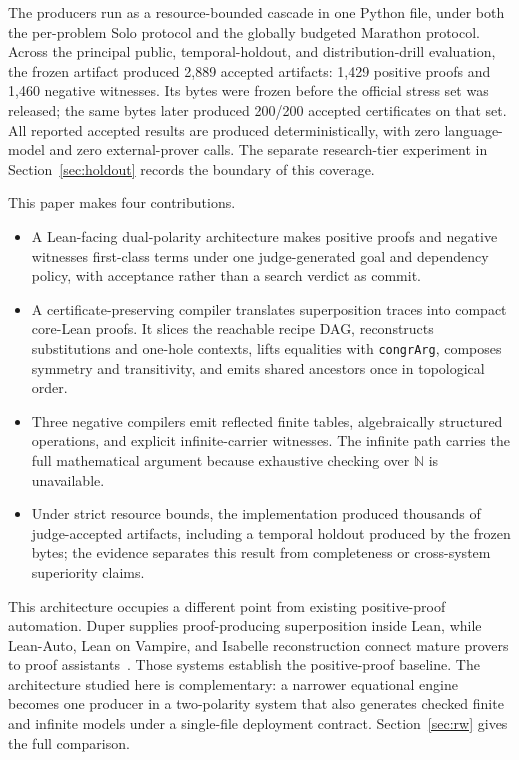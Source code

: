 \documentclass[10pt,twocolumn]{article}
\newcommand{\Nat}{\mathbb{N}}
\newcommand{\code}[1]{\texttt{#1}}
\begin{document}
The producers run as a resource-bounded cascade in one Python file, under both
the per-problem Solo protocol and the globally budgeted Marathon protocol.
Across the principal public, temporal-holdout, and distribution-drill
evaluation, the frozen artifact produced 2,889 accepted artifacts: 1,429
positive proofs and 1,460 negative witnesses.  Its bytes were frozen before
the official stress set was released; the same bytes later produced 200/200
accepted certificates on that set.  All reported accepted results are
produced deterministically, with zero language-model and zero external-prover
calls.  The separate research-tier experiment in
Section~\ref{sec:holdout} records the boundary of this coverage.

This paper makes four contributions.
\begin{itemize}
  \item A Lean-facing dual-polarity architecture makes positive proofs and
  negative witnesses first-class terms under one judge-generated goal and
  dependency policy, with acceptance rather than a search verdict as commit.
  \item A certificate-preserving compiler translates superposition traces into
  compact core-Lean proofs.  It slices the reachable recipe DAG, reconstructs
  substitutions and one-hole contexts, lifts equalities with \code{congrArg},
  composes symmetry and transitivity, and emits shared ancestors once in
  topological order.
  \item Three negative compilers emit reflected finite tables, algebraically
  structured operations, and explicit infinite-carrier witnesses.  The infinite path carries the full mathematical
  argument because exhaustive checking over $\Nat$ is unavailable.
  \item Under strict resource bounds, the implementation produced thousands
  of judge-accepted artifacts, including a temporal holdout produced by the
  frozen bytes; the evidence separates this result from completeness or
  cross-system superiority claims.
\end{itemize}

This architecture occupies a different point from existing positive-proof
automation.  Duper supplies proof-producing superposition inside Lean, while
Lean-Auto, Lean on Vampire, and Isabelle reconstruction connect mature provers
to proof assistants~\cite{duper,leanAuto,leanVampire,slam}.  Those systems establish the
positive-proof baseline.  The architecture studied here is complementary: a
narrower equational engine becomes one producer in a two-polarity system that
also generates checked finite and infinite models under a single-file
deployment contract.  Section~\ref{sec:rw} gives the full
comparison.
\end{document}
